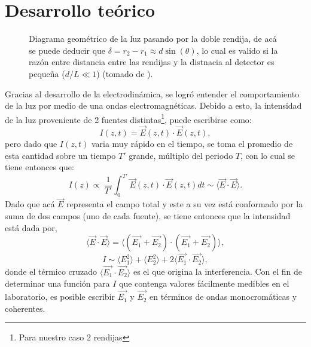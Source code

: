 \documentclass[%
 reprint,
 amsmath,amssymb,
 aps,
]{revtex4-1}
\begin{document}
\section{Desarrollo teórico}
\begin{figure}[h]
\caption{\label{doble rendija} Diagrama geométrico de la luz pasando por la doble rendija, de acá se puede deducir que $\delta=r_2-r_1\approx d\sin(\theta)$, lo cual es valido si la razón entre distancia entre las rendijas y la distnacia al detector es pequeña ($d/L\ll 1$)   (tomado de \cite{MIT}).}
\end{figure}
Gracias al desarrollo de la electrodinámica, se logró entender el comportamiento de la luz por medio de una ondas electromagnéticas. Debido a esto, la intensidad de la luz proveniente de 2 fuentes distintas\footnote{Para nuestro caso 2 rendijas}, puede escribirse como:
\[I(z,t)=\vec{E}(z,t)\cdot \vec{E}(z,t),\]
pero dado que $I(z,t)$ varia muy rápido en el tiempo, se toma el promedio de esta cantidad sobre un tiempo $T'$ grande, múltiplo del periodo $T$, con lo cual se tiene entonces que:
\[I(z)\propto\ \frac{1}{T'}\int_{0}^{T'}\vec{E}(z,t)\cdot \vec{E}(z,t) dt \sim \langle \vec{E}\cdot \vec{E}\rangle.\]
Dado que acá $\vec{E}$ representa el campo total y este a su vez está conformado por la suma de dos campos (uno de cada fuente), se tiene entonces que la intensidad está dada por,
\begin{equation*}
  \langle \vec{E}\cdot \vec{E}\rangle = \langle (\vec{E_1}+\vec{E_2})\cdot (\vec{E_1}+\vec{E_2})\rangle,
\end{equation*}
\begin{equation}
I\sim \langle E_1^2\rangle+\langle E_2^2\rangle+2\langle \vec{E_1}\cdot  \vec{E_2}\rangle,
\label{difrac}
\end{equation}
donde el térmico cruzado $\langle \vec{E_1}\cdot  \vec{E_2}\rangle$ es el que origina la interferencia. Con el fin de determinar una función para $I$ que contenga valores fácilmente medibles en el laboratorio, es posible escribir $\vec{E_1}$ y $\vec{E_2}$ en términos de ondas monocromáticas y coherentes.
\end{document}
